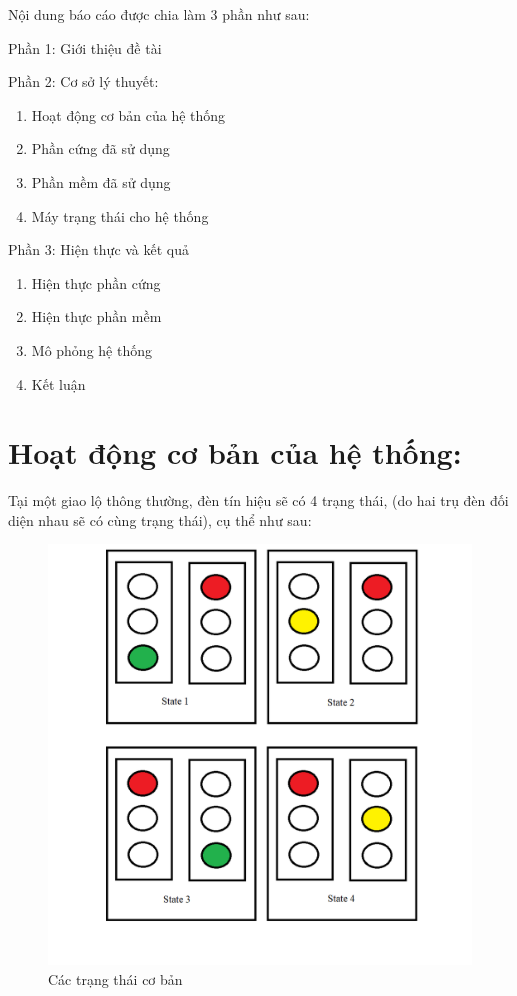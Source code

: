 \documentclass[a4paper]{article}
\begin{document}
Nội dung báo cáo được chia làm 3 phần như sau:

Phần 1: Giới thiệu đề tài

Phần 2: Cơ sở lý thuyết:

\begin{enumerate}
	\item Hoạt động cơ bản của hệ thống
	\item Phần cứng đã sử dụng
	\item Phần mềm đã sử dụng
	\item Máy trạng thái cho hệ thống
\end{enumerate}

Phần 3: Hiện thực và kết quả

\begin{enumerate}
	\item Hiện thực phần cứng
	\item Hiện thực phần mềm
	\item Mô phỏng hệ thống
	\item Kết luận
\end{enumerate}

\section{Hoạt động cơ bản của hệ thống:}
Tại một giao lộ thông thường, đèn tín hiệu sẽ có 4 trạng thái, (do hai trụ đèn đối diện nhau sẽ có cùng trạng thái), cụ thể như sau:

\begin{figure}[H]
\begin{center}
\includegraphics[width=12cm]{pic1.png}
\caption{Các trạng thái cơ bản}
\end{center}
\end{figure}
\end{document}
